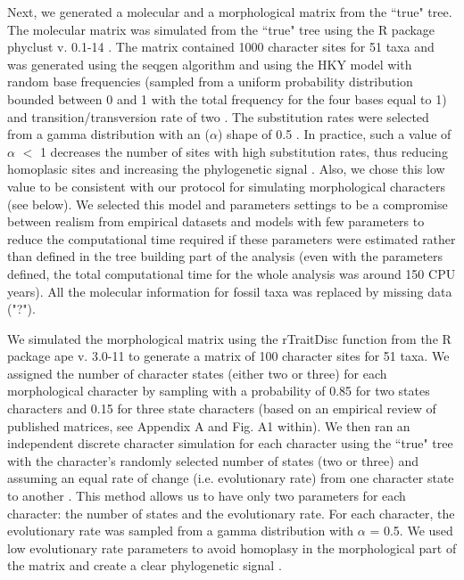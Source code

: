 \documentclass[12pt,letterpaper]{article}
\begin{document}
Next, we generated a molecular and a morphological matrix from the ``true" tree.
The molecular matrix was simulated from the ``true" tree using the R package phyclust v. 0.1-14 \citep{chen2011}.
The matrix contained 1000 character sites for 51 taxa and was generated using the seqgen algorithm \citep{ranbaut1997seqgen} and using the HKY model \citep{HKY85} with random base frequencies (sampled from a uniform probability distribution bounded between 0 and 1 with the total frequency for the four bases equal to 1) and transition/transversion rate of two \citep{douadycomparison2003}.
The substitution rates were selected from a gamma distribution with an ($\alpha$) shape of 0.5 \citep{yangamong-site1996}.
In practice, such a value of $\alpha$ $<$ 1 decreases the number of sites with high substitution rates, thus reducing homoplasic sites and increasing the phylogenetic signal \citep{Hassanin1998611,EstoupHomoplasy}.
Also, we chose this low value to be consistent with our protocol for simulating morphological characters (see below).
We selected this model and parameters settings to be a compromise between realism from empirical datasets \citep[e.g.][]{kellymolecular2014} and models with few parameters \citep[cf.][]{springermacroevolutionary2012} to reduce the computational time required if these parameters were estimated rather than defined in the tree building part of the analysis (even with the parameters defined, the total computational time for the whole analysis was around 150 CPU years).
All the molecular information for fossil taxa was replaced by missing data ("?").

We simulated the morphological matrix using the rTraitDisc function from the R package ape v. 3.0-11 \citep{paradisape:2004} to generate a matrix of 100 character sites for 51 taxa.
We assigned the number of character states (either two or three) for each morphological character by sampling with a probability of 0.85 for two states characters and 0.15 for three state characters (based on an empirical review of published matrices, see Appendix A and Fig. A1 within).
We then ran an independent discrete character simulation for each character using the ``true" tree with the character's randomly selected number of states (two or three) and assuming an equal rate of change (i.e. evolutionary rate) from one character state to another \citep{Pagel22011994}. This method allows us to have only two parameters for each character: the number of states and the evolutionary rate.
For each character, the evolutionary rate was sampled from a gamma distribution with $\alpha$ = 0.5. We used low evolutionary rate parameters to avoid homoplasy in the morphological part of the matrix and create a clear phylogenetic signal \citep{wagner2000,davalosintegrating2014,wrightbayesian2014}.
\end{document}
